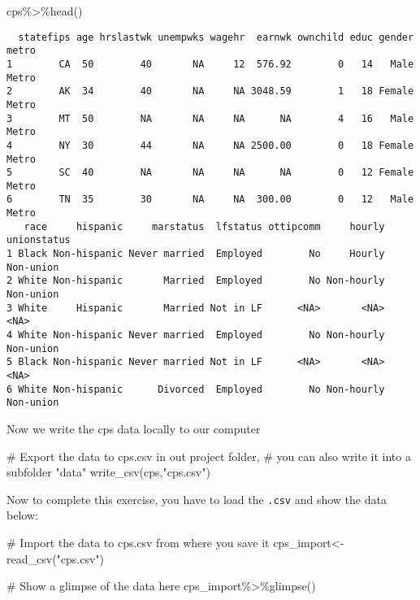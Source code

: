 \documentclass[
  letterpaper,
  DIV=11,
  numbers=noendperiod]{scrartcl}
\newenvironment{Shaded}{\begin{snugshade}}{\end{snugshade}}
\newcommand{\CommentTok}[1]{\textcolor[rgb]{0.37,0.37,0.37}{#1}}
\newcommand{\FunctionTok}[1]{\textcolor[rgb]{0.28,0.35,0.67}{#1}}
\newcommand{\NormalTok}[1]{\textcolor[rgb]{0.00,0.23,0.31}{#1}}
\newcommand{\OtherTok}[1]{\textcolor[rgb]{0.00,0.23,0.31}{#1}}
\newcommand{\SpecialCharTok}[1]{\textcolor[rgb]{0.37,0.37,0.37}{#1}}
\newcommand{\StringTok}[1]{\textcolor[rgb]{0.13,0.47,0.30}{#1}}
\begin{document}
\begin{Shaded}
\begin{Highlighting}[]
\NormalTok{cps}\SpecialCharTok{\%\textgreater{}\%}\FunctionTok{head}\NormalTok{()}
\end{Highlighting}
\end{Shaded}

\begin{verbatim}
  statefips age hrslastwk unempwks wagehr  earnwk ownchild educ gender metro
1        CA  50        40       NA     12  576.92        0   14   Male Metro
2        AK  34        40       NA     NA 3048.59        1   18 Female Metro
3        MT  50        NA       NA     NA      NA        4   16   Male Metro
4        NY  30        44       NA     NA 2500.00        0   18 Female Metro
5        SC  40        NA       NA     NA      NA        0   12 Female Metro
6        TN  35        30       NA     NA  300.00        0   12   Male Metro
   race     hispanic     marstatus  lfstatus ottipcomm     hourly unionstatus
1 Black Non-hispanic Never married  Employed        No     Hourly   Non-union
2 White Non-hispanic       Married  Employed        No Non-hourly   Non-union
3 White     Hispanic       Married Not in LF      <NA>       <NA>        <NA>
4 White Non-hispanic Never married  Employed        No Non-hourly   Non-union
5 Black Non-hispanic Never married Not in LF      <NA>       <NA>        <NA>
6 White Non-hispanic      Divorced  Employed        No Non-hourly   Non-union
\end{verbatim}

Now we write the cps data locally to our computer

\begin{Shaded}
\begin{Highlighting}[]
\CommentTok{\# Export the data to cps.csv in out project folder, }
\CommentTok{\# you can also write it into a subfolder "data"}
\FunctionTok{write\_csv}\NormalTok{(cps,}\StringTok{"cps.csv"}\NormalTok{)}
\end{Highlighting}
\end{Shaded}

Now to complete this exercise, you have to load the \texttt{.csv} and
show the data below:

\begin{Shaded}
\begin{Highlighting}[]
\CommentTok{\# Import the data to cps.csv from where you save it}
\NormalTok{cps\_import}\OtherTok{\textless{}{-}}\FunctionTok{read\_csv}\NormalTok{(}\StringTok{"cps.csv"}\NormalTok{)}

\CommentTok{\# Show a glimpse of the data here}
\NormalTok{cps\_import}\SpecialCharTok{\%\textgreater{}\%}\FunctionTok{glimpse}\NormalTok{()}
\end{Highlighting}
\end{Shaded}
\end{document}
